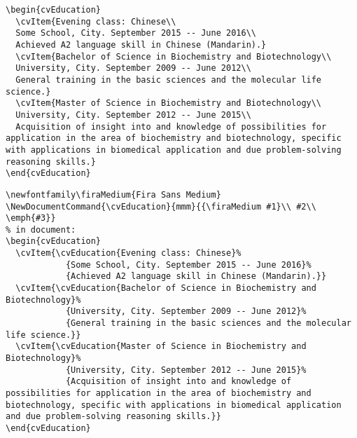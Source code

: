 \documentclass{ltxdoc}
\begin{document}
  \begin{lstlisting}[caption={\lstinline!cvEducation! \emph{without} special user markup command.}]
\begin{cvEducation}
  \cvItem{Evening class: Chinese\\
  Some School, City. September 2015 -- June 2016\\
  Achieved A2 language skill in Chinese (Mandarin).}
  \cvItem{Bachelor of Science in Biochemistry and Biotechnology\\
  University, City. September 2009 -- June 2012\\
  General training in the basic sciences and the molecular life science.}
  \cvItem{Master of Science in Biochemistry and Biotechnology\\
  University, City. September 2012 -- June 2015\\
  Acquisition of insight into and knowledge of possibilities for application in the area of biochemistry and biotechnology, specific with applications in biomedical application and due problem-solving reasoning skills.}
\end{cvEducation}
  \end{lstlisting}
  
  \begin{lstlisting}[caption={\lstinline!cvEducation! \emph{with} special user markup command.}]
% in preamble:
\newfontfamily\firaMedium{Fira Sans Medium}
\NewDocumentCommand{\cvEducation}{mmm}{{\firaMedium #1}\\ #2\\ \emph{#3}}
% in document:
\begin{cvEducation}
  \cvItem{\cvEducation{Evening class: Chinese}%
            {Some School, City. September 2015 -- June 2016}%
            {Achieved A2 language skill in Chinese (Mandarin).}}
  \cvItem{\cvEducation{Bachelor of Science in Biochemistry and Biotechnology}%
            {University, City. September 2009 -- June 2012}%
            {General training in the basic sciences and the molecular life science.}}
  \cvItem{\cvEducation{Master of Science in Biochemistry and Biotechnology}%
            {University, City. September 2012 -- June 2015}%
            {Acquisition of insight into and knowledge of possibilities for application in the area of biochemistry and biotechnology, specific with applications in biomedical application and due problem-solving reasoning skills.}}
\end{cvEducation}
  \end{lstlisting}
  
\end{document}

